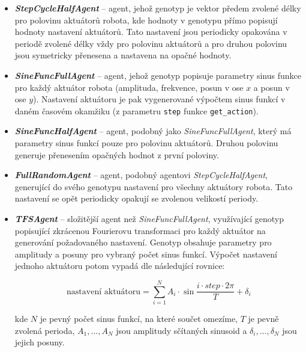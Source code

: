 \label{imp:gaAgents.stepcyclehalfagent}
\label{imp:gaAgents.sinefuncfullagent}
\label{imp:gaAgents.sinefunchalfagent}
\label{imp:gaAgents.fullrandom}
\label{imp:gaAgents.TFSagent}
\begin{itemize}
    \item \textbf{\emph{StepCycleHalfAgent}} -- agent, jehož genotyp je vektor předem
        zvolené délky pro polovinu aktuátorů robota, kde hodnoty v genotypu přímo
        popisují hodnoty nastavení aktuátorů. Tato nastavení jsou periodicky
        opakována v periodě zvolené délky vždy pro polovinu aktuátorů a pro
        druhou polovinu jsou symetricky přenesena a nastavena na opačné
        hodnoty.
    \item \textbf{\emph{SineFuncFullAgent}} -- agent, jehož genotyp popisuje
        parametry sinus \linebreak funkce pro každý aktuátor robota (amplituda,
        frekvence, posun v ose $x$ a posun v ose $y$). Nastavení aktuátoru je
        pak vygenerované výpočtem sinus funkcí v daném časovém okamžiku (z
        parametru \texttt{step} funkce \texttt{get\_action}).
    \item \textbf{\emph{SineFuncHalfAgent}} -- agent, podobný jako
        \emph{SineFuncFullAgent}, který má parametry sinus funkcí pouze pro
        polovinu aktuátorů. Druhou polovinu generuje přenesením opačných hodnot
        z první poloviny.
    \item \textbf{\emph{FullRandomAgent}} -- agent, podobný agentovi
        \emph{StepCycleHalfAgent}, generující do svého genotypu nastavení pro všechny
        aktuátory robota. Tato nastavení se opět periodicky opakují se zvolenou
        velikostí periody.
    \item \textbf{\emph{TFSAgent}} -- složitější agent než \emph{SineFuncFullAgent},
        využívající genotyp popisující zkrácenou Fourierovu transformaci pro
        každý aktuátor na generování požadovaného nastavení. Genotyp obsahuje
        parametry pro amplitudy a posuny pro vybraný počet sinus funkcí.
        Výpočet nastavení jednoho aktuátoru potom vypadá dle následující
        rovnice:

        \begin{equation}
            \text{nastavení aktuátoru} = \sum_{i=1}^{N}A_i\cdot\sin\frac{i\cdot
            step\cdot2\pi}{T} + \delta_i
        \end{equation}

        kde $N$ je pevný počet sinus funkcí, na které součet omezíme, $T$ je
        pevně zvolená perioda, $A_1,...,A_N$ jsou amplitudy sčítaných
        sinusoid a $\delta_i,...,\delta_N$ jsou jejich posuny.
\end{itemize}

